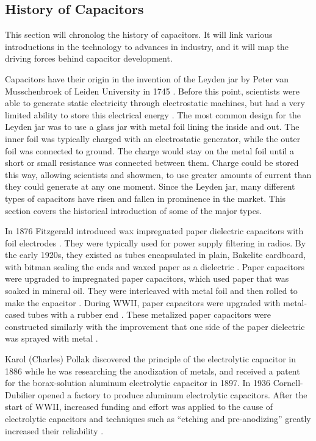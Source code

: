 \subsection {History of Capacitors}
\label{sec:history}

This section will chronolog the history of capacitors. It will link various introductions in the technology to advances in industry, and it will map the driving forces behind capacitor development.

Capacitors have their origin in the invention of the Leyden jar by Peter van Musschenbroek of Leiden University in 1745 \cite{empLight}. Before this point, scientists were able to generate static electricity through electrostatic machines, but had a very limited ability to store this electrical energy \cite{ieee_hist}.
The most common design for the Leyden jar was to use a glass jar with metal foil lining the inside and out. The inner foil was typically charged with an electrostatic generator, while the outer foil was connected to ground. The charge would stay on the metal foil until a short or small resistance was connected between them. Charge could be stored this way, allowing scientists and showmen, to use greater amounts of current than they could generate at any one moment.
Since the Leyden jar, many different types of capacitors have risen and fallen in prominence in the market. This section covers the historical introduction of some of the major types.

In 1876 Fitzgerald introduced wax impregnated paper dielectric capacitors with foil electrodes \cite[ch.~11]{dumInv}\cite{learn_caps}. They were typically used for power supply filtering in radios. By the early 1920s, they existed as tubes encapsulated in plain, Bakelite cardboard, with bitman sealing the ends and waxed paper as a dielectric \cite[ch~3]{dumInv}.
Paper capacitors were upgraded to impregnated paper capacitors, which used paper that was soaked in mineral oil. They were interleaved with metal foil and then rolled to make the capacitor \cite[ch.~8.2.1.1]{poorIntro}. During WWII, paper capacitors were upgraded with metal-cased tubes with a rubber end \cite[ch.~8.1]{poorIntro}. These metalized paper capacitors were constructed similarly with the improvement that one side of the paper dielectric was sprayed with metal \cite{hist_cerFilt}.

Karol (Charles) Pollak discovered the principle of the electrolytic capacitor in 1886 while he was researching the anodization of metals, and received a patent for the borax-solution aluminum electrolytic capacitor in 1897.
In 1936 Cornell-Dubilier opened a factory to produce aluminum electrolytic capacitors.
After the start of WWII, increased funding and effort was applied to the cause of electrolytic capacitors and techniques such as ``etching and pre-anodizing'' greatly increased their reliability \cite{deis_hist}\cite{wiki_elec}.

